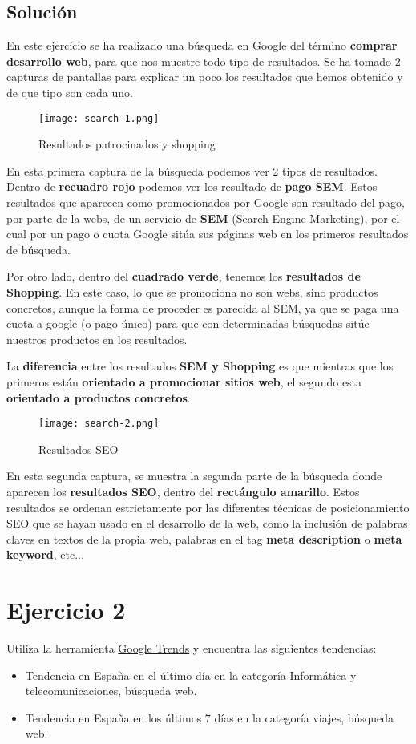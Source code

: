 \subsection{Solución}
En este ejercicio se ha realizado una búsqueda en Google del término \textbf{comprar desarrollo web}, para que nos muestre todo tipo de resultados. Se ha tomado 2 capturas de pantallas para explicar un poco los resultados que hemos obtenido y de que tipo son cada uno.

\begin{figure}[H]
    \centering
    \texttt{[image: search-1.png]}
    \caption{Resultados patrocinados y shopping}
\end{figure}

En esta primera captura de la búsqueda podemos ver 2 tipos de resultados. Dentro de \textbf{recuadro rojo} podemos ver los resultado de \textbf{pago SEM}. Estos resultados que aparecen como promocionados por Google son resultado del pago, por parte de la webs, de un servicio de \textbf{SEM} (Search Engine Marketing), por el cual por un pago o cuota Google sitúa sus páginas web en los primeros resultados de búsqueda.

Por otro lado, dentro del \textbf{cuadrado verde}, tenemos los \textbf{resultados de Shopping}. En este caso, lo que se promociona no son webs, sino productos concretos, aunque la forma de proceder es parecida al SEM, ya que se paga una cuota a google (o pago único) para que con determinadas búsquedas sitúe nuestros productos en los resultados.

La\textbf{ diferencia} entre los resultados \textbf{SEM y Shopping} es que mientras que los primeros están \textbf{orientado a promocionar sitios web}, el segundo esta \textbf{orientado a productos concretos}.

\begin{figure}[H]
    \centering
    \texttt{[image: search-2.png]}
    \caption{Resultados SEO}
\end{figure}

En esta segunda captura, se muestra la segunda parte de la búsqueda donde aparecen los \textbf{resultados SEO}, dentro del \textbf{rectángulo amarillo}. Estos resultados se ordenan estrictamente por las diferentes técnicas de posicionamiento SEO que se hayan usado en el desarrollo de la web, como la inclusión de palabras claves en textos de la propia web, palabras en el tag \textbf{meta description} o \textbf{meta keyword}, etc...

\section{Ejercicio 2}
Utiliza la herramienta \href{https://trends.google.es/trends/}{Google Trends} y encuentra las siguientes tendencias:
\begin{itemize}
    \item Tendencia en España en el último día en la categoría Informática y telecomunicaciones, búsqueda web.
    \item Tendencia en España en los últimos 7 días  en la categoría viajes, búsqueda web.
\end{itemize}


